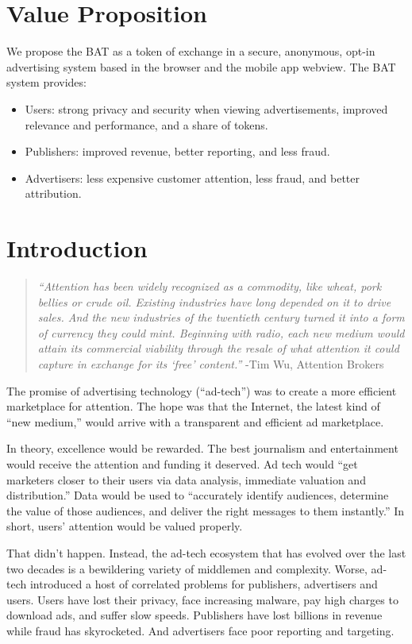 \documentclass[11pt]{article}
\begin{document}
\section{Value Proposition}
\label{sec-2}

We propose the BAT as a token of exchange in a secure, anonymous, opt-in advertising system based in the browser and the mobile app webview. The BAT system provides: 
\begin{itemize}
\item{Users: strong privacy and security when viewing advertisements, improved relevance and performance, and a share of tokens. }
\item{Publishers: improved  revenue, better reporting, and less fraud. }
\item{Advertisers: less expensive customer attention, less fraud, and better attribution.}
\end{itemize}
\section{Introduction}
\label{sec-3}

\begin{quote}\textit{“Attention has been widely recognized as a commodity, like wheat, pork bellies or crude oil. Existing industries have long depended on it to drive sales. And the new industries of the twentieth century turned it into a form of currency they could mint. Beginning with radio, each new medium would attain its commercial viability through the resale of what attention it could capture in exchange for its ‘free’ content.”} -Tim Wu, Attention Brokers \end{quote} 

The promise of advertising technology (“ad-tech”) was to create a more efficient marketplace for attention. The hope was that the Internet, the latest kind of “new medium,” would arrive with a transparent and efficient ad marketplace. 

In theory, excellence would be rewarded. The best journalism and entertainment would receive the attention and funding it deserved. Ad tech would “get marketers closer to their users via data analysis, immediate valuation and distribution.” Data would be used to “accurately identify audiences, determine the value of those audiences, and deliver the right messages to them instantly.”\cite{1} In short, users’ attention would be valued properly. 

That didn’t happen. Instead, the ad-tech ecosystem that has evolved over the last two decades is a bewildering variety of middlemen and complexity. Worse, ad-tech introduced a host of correlated problems for publishers, advertisers and users. Users have lost their privacy, face increasing malware, pay high charges to download ads, and suffer slow speeds. Publishers have lost billions in revenue while fraud has skyrocketed. And advertisers face poor reporting and targeting.  
\end{document}
